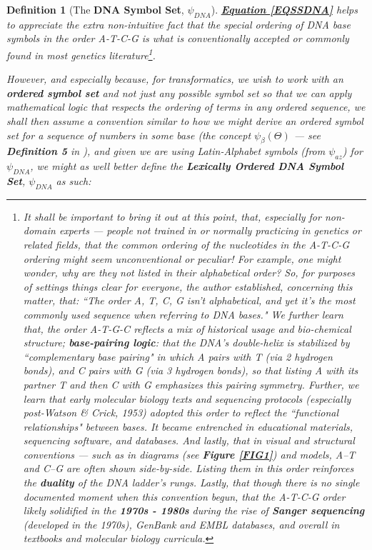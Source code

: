 \documentclass[a4paper, 18pt]{book} %
\newtheorem{defn}{Definition}
\begin{document}
{\begin{minipage}{0.9\textwidth}
\begin{defn}[The \textbf{DNA Symbol Set}, $\psi_{DNA}$]
    \textbf{\hyperref[EQSSDNA]{Equation \ref{EQSSDNA}}} helps to appreciate the extra non-intuitive fact that the special ordering of DNA base symbols in the order A-T-C-G is what is conventionally accepted\cite{nature_atcg}\cite{wikipedia_nucleic_acid} or commonly found in most genetics literature\footnote{It shall be important to bring it out at this point, that, especially for non-domain experts --- people not trained in or normally practicing in genetics or related fields, that the common ordering of the nucleotides in the A-T-C-G ordering might seem unconventional or peculiar! For example, one might wonder, why are they not listed in their alphabetical order? So, for purposes of settings things clear for everyone, the author established\cite{copilot_dna_assistant}, concerning this matter, that: ``The order A, T, C, G isn't alphabetical, and yet it's the most commonly used sequence when referring to DNA bases." We further learn that, the order A-T-G-C reflects a mix of historical usage and bio-chemical structure; \textbf{base-pairing logic}: that the DNA's double-helix is stabilized by ``complementary base pairing" in which A pairs with T (via 2 hydrogen bonds), and C pairs with G (via 3 hydrogen bonds), so that listing A with its partner T and then C with G emphasizes this pairing symmetry\cite{copilot_dna_assistant}. Further, we learn that early molecular biology texts and sequencing protocols (especially post-Watson \& Crick, 1953) adopted this order to reflect the ``functional relationships" between bases. It became entrenched in educational materials, sequencing software, and databases. And lastly, that in visual and structural conventions --- such as in diagrams (see \textbf{Figure \ref{FIG1}}) and models, A–T and C–G are often shown side-by-side. Listing them in this order reinforces the \textbf{duality} of the DNA ladder's rungs\cite{copilot_dna_assistant}. Lastly, that though there is no single documented moment when this convention begun, that the A-T-C-G order likely solidified in the \textbf{1970s - 1980s} during the rise of \textbf{Sanger sequencing} (developed in the 1970s), GenBank and EMBL databases, and overall in textbooks and molecular biology curricula.}.

However, and especially because, for transformatics, we wish to work with an \textbf{ordered symbol set}\cite{ossipaper} and not just \textit{any possible symbol set} so that we can apply mathematical logic that respects the ordering of terms in any ordered sequence\cite{transformatics}, we shall then assume a convention similar to how we might derive an ordered symbol set for a sequence of numbers in some base (the concept $\psi_\beta(\Theta)$ --- see \textbf{Definition 5} in \cite{ossipaper}), and given we are using Latin-Alphabet symbols (from $\psi_{az}$\cite{transformatics}) for $\psi_{DNA}$, we might as well better define the \textbf{Lexically Ordered DNA Symbol Set}, $\psi_{DNA}$ as such:


\end{defn}
\end{minipage}}
\end{document}
